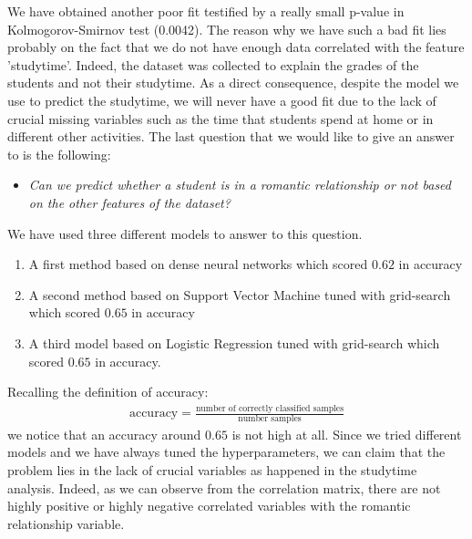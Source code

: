 \documentclass[a4paper, 11pt]{report}
\theoremstyle{definition}
\numberwithin{equation}{section}		%
\numberwithin{figure}{section}			%
\numberwithin{table}{section}				%
\begin{document}
We have obtained another poor fit testified by a really small p-value in Kolmogorov-Smirnov test (0.0042). The reason why we have such a bad fit lies probably on the fact that we do not have enough data correlated with the feature 'studytime'. Indeed, the dataset was collected to explain the grades of the students and not their studytime. As a direct consequence, despite the model we use to predict the studytime, we will never have a good fit due to the lack of crucial missing variables such as the time that students spend at home or in different other activities.
The last question that we would like to give an answer to is the following:
\begin{itemize}
    \item \textit{Can we predict whether a student is in a romantic relationship or not based on the other features of the dataset?}
\end{itemize}
We have used three different models to answer to this question.
\begin{enumerate}
    \item A first method based on dense neural networks which scored $0.62$ in accuracy
    \item A second method based on Support Vector Machine tuned with grid-search which scored $0.65$ in accuracy 
    \item A third model based on Logistic Regression tuned with grid-search which scored $0.65$ in accuracy.
\end{enumerate}
Recalling the definition of accuracy:
\begin{align*}
    \text{accuracy} = \frac{\text{number of correctly classified samples}}{\text{number samples}}
\end{align*}
we notice that an accuracy around $0.65$ is not high at all. Since we tried different models and we have always tuned the hyperparameters, we can claim that the problem lies in the lack of crucial variables as happened in the studytime analysis. Indeed, as we can observe from the correlation matrix, there are not highly positive or highly negative correlated variables with the romantic relationship variable.
\end{document}
